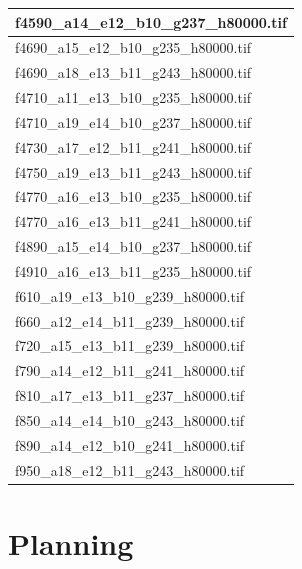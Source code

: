 \documentclass[12pt, twoside]{article}
\begin{document}
\begin{appendices}
\begin{longtable}{|l|}
		f4590\_a14\_e12\_b10\_g237\_h80000.tif \\ \hline 
		f4690\_a15\_e12\_b10\_g235\_h80000.tif \\ \hline 
		f4690\_a18\_e13\_b11\_g243\_h80000.tif \\ \hline 
		f4710\_a11\_e13\_b10\_g235\_h80000.tif \\ \hline 
		f4710\_a19\_e14\_b10\_g237\_h80000.tif \\ \hline 
		f4730\_a17\_e12\_b11\_g241\_h80000.tif \\ \hline 
		f4750\_a19\_e13\_b11\_g243\_h80000.tif \\ \hline 
		f4770\_a16\_e13\_b10\_g235\_h80000.tif \\ \hline 
		f4770\_a16\_e13\_b11\_g241\_h80000.tif \\ \hline 
		f4890\_a15\_e14\_b10\_g237\_h80000.tif \\ \hline 
		f4910\_a16\_e13\_b11\_g235\_h80000.tif \\ \hline 
		f610\_a19\_e13\_b10\_g239\_h80000.tif \\ \hline 
		f660\_a12\_e14\_b11\_g239\_h80000.tif \\ \hline 
		f720\_a15\_e13\_b11\_g239\_h80000.tif \\ \hline 
		f790\_a14\_e12\_b11\_g241\_h80000.tif \\ \hline 
		f810\_a17\_e13\_b11\_g237\_h80000.tif \\ \hline 
		f850\_a14\_e14\_b10\_g243\_h80000.tif \\ \hline 
		f890\_a14\_e12\_b10\_g241\_h80000.tif \\ \hline 
		f950\_a18\_e12\_b11\_g243\_h80000.tif \\ \hline 
	\end{longtable}
	
	\section{Planning}
	
\end{appendices}
\end{document}
